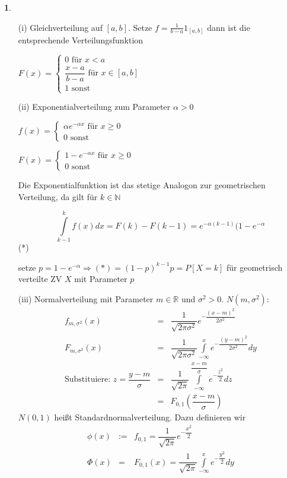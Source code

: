 \documentclass[10pt,a4paper]{report}
\newcommand{\N}{\mathbb{N}}
\newcommand{\R}{\mathbb{R}}
\numberwithin{equation}{section}
\numberwithin{figure}{section}
\theoremstyle{plain}
\theoremstyle{definition}
\theoremstyle{plain}
\theoremstyle{definition}
\newtheorem{example}{\protect\examplename}[section]
\theoremstyle{remark}
\theoremstyle{plain}
\theoremstyle{plain}
\theoremstyle{plain}
\theoremstyle{plain}
\theoremstyle{plain}
\providecommand{\examplename}{Beispiel}
\newcommand{\1}{ \mathbb{1} } %
\begin{document}
\begin{example}
  \begin{itemize}
  \item[(i)] Gleichverteilung auf $[a,b]$. Setze
    $f=\frac{1}{b-a}1_[a,b]$ dann ist die entsprechende
    Verteilungsfunktion
    \begin{center}
      $F(x)=\begin{cases}
        0 \text{ für } x < a\\
        \dfrac{x-a}{b-a} \text{ für } x \in [a,b]\\
        1 \text{ sonst }
      \end{cases}$
    \end{center}
  \item[(ii)] Exponentialverteilung zum Parameter $\alpha >0$
    \begin{center}
      $f(x)=\begin{cases}
        \alpha e^{-\alpha x} \text{ für } x \geq 0\\
        0 \text{ sonst }
      \end{cases}$
    \end{center}
    \begin{center}
      $F(x)=\begin{cases}
        1-e^{-\alpha x} \text{ für } x \geq 0\\
        0 \text{ sonst }
      \end{cases}$
    \end{center}
    Die Exponentialfunktion ist das stetige Analogon zur geometrischen
    Verteilung, da gilt für $k \in \N$
    \begin{center}
      \[ \int\limits_{k-1}^k
      f(x)dx=F(k)-F(k-1)=e^{-\alpha(k-1)}(1-e^{-\alpha}\] \qquad (*)
    \end{center}
    setze $p=1-e^{-\alpha} \Rightarrow (*)=(1-p)^{k-1}p=P[X=k]$ für
    geometrisch verteilte ZV $X$ mit Parameter $p$
  \item[(iii)] Normalverteilung mit Parameter $m \in \R$ und
    $\sigma^2>0$. $N(m,\sigma^2)$:
    \begin{eqnarray*}
      f_{m,\sigma^2}(x)&=&\dfrac{1}{\sqrt{2\pi \sigma^2}} e^{-\dfrac{(x-m)^2}{2\sigma^2}}\\
      F_{m,\sigma^2}(x)&=&\dfrac{1}{\sqrt{2\pi \sigma^2}} \int\limits_{-\infty}^xe^{-\dfrac{(y-m)^2}{2\sigma^2}}dy\\
      \text{Substituiere: }z=\dfrac{y-m}{\sigma}&=&\dfrac{1}{\sqrt{2\pi}} \int\limits_{-\infty}^{\dfrac{x-m}{\sigma}}e^{-\dfrac{z^2}{2}}dz\\
      &=&F_{0,1}\left(\dfrac{x-m}{\sigma}\right)
    \end{eqnarray*}
    $N(0,1)$ heißt Standardnormalverteilung. Dazu definieren wir
    \begin{eqnarray*}
      \phi(x)&:=& f_{0,1}=\dfrac{1}{\sqrt{2\pi}}e^{-\dfrac{x^2}{2}}\\
      \Phi(x)&=& F_{0,1}(x)=\dfrac{1}{\sqrt{2\pi}}\int\limits_{-\infty}^x e^{-\dfrac{y^2}{2}}dy
    \end{eqnarray*}
  \end{itemize}
\end{example}
\end{document}
